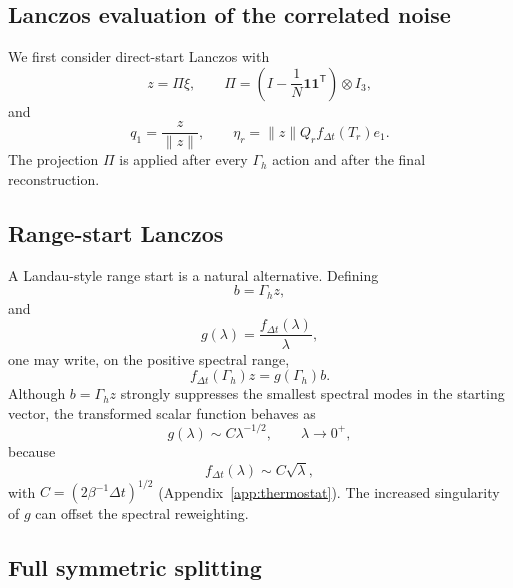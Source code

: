 \documentclass[11pt]{article}
\theoremstyle{plain}
\DeclareRobustCommand{\_}{\textunderscore\allowbreak}
\begin{document}
\subsection{Lanczos evaluation of the correlated noise}
\label{sec:lanczos}

We first consider direct-start Lanczos with
\begin{equation}
z=\Pi\xi,
\qquad
\Pi=\left(I-\frac{1}{N}\bm{1}\bm{1}^{\mathsf T}\right)\otimes I_3,
\end{equation}
and
\begin{equation}
q_1=\frac{z}{\|z\|},
\qquad
\eta_r
=
\|z\|Q_r f_{\Delta t}(T_r)e_1.
\end{equation}
The projection $\Pi$ is applied after every $\Gamma_h$ action and after the final reconstruction.

\subsection{Range-start Lanczos}
\label{sec:range-start}

A Landau-style range start is a natural alternative. Defining
\begin{equation}
b=\Gamma_h z,
\end{equation}
and
\begin{equation}
g(\lambda)=\frac{f_{\Delta t}(\lambda)}{\lambda},
\end{equation}
one may write, on the positive spectral range,
\begin{equation}
f_{\Delta t}(\Gamma_h)z
=
g(\Gamma_h)b.
\end{equation}
Although $b=\Gamma_h z$ strongly suppresses the smallest spectral modes in the starting vector, the transformed scalar function behaves as
\begin{equation}
g(\lambda)
\sim
C\lambda^{-1/2},
\qquad \lambda\to0^+,
\end{equation}
because
\begin{equation}
f_{\Delta t}(\lambda)\sim C\sqrt{\lambda},
\end{equation}
with $C=(2\beta^{-1}\Delta t)^{1/2}$ (Appendix~\ref{app:thermostat}).
The increased singularity of $g$ can offset the spectral reweighting.

\subsection{Full symmetric splitting}
\label{sec:splitting}
\end{document}
